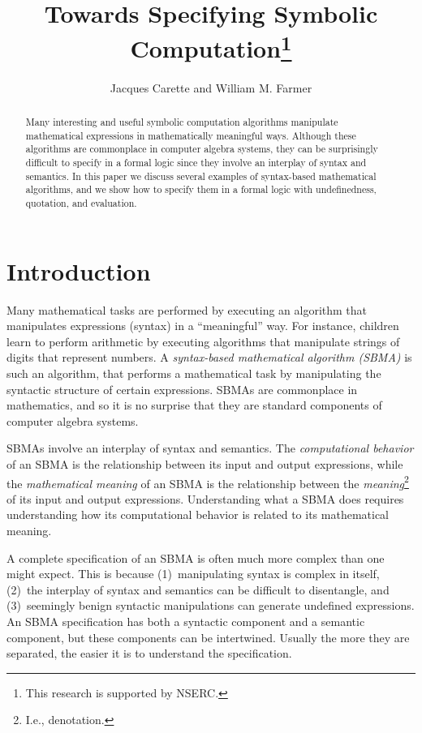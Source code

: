 \documentclass[fleqn]{llncs}
\title{Towards Specifying Symbolic Computation\thanks{This research is
    supported by NSERC.}}
\author{Jacques Carette and William M. Farmer}
\institute{%
Computing and Software, McMaster University, Canada\\
\url{http://www.cas.mcmaster.ca/~carette}\\
\url{http://imps.mcmaster.ca/wmfarmer}%
}
\begin{document}
\maketitle

\begin{abstract}
\bsp
Many interesting and useful symbolic computation algorithms manipulate
mathematical expressions in mathematically meaningful ways.  Although
these algorithms are commonplace in computer algebra systems, they can
be surprisingly difficult to specify in a formal logic since they
involve an interplay of syntax and semantics.  In this paper we
discuss several examples of syntax-based mathematical algorithms, and
we show how to specify them in a formal logic with undefinedness,
quotation, and evaluation.
\esp
\end{abstract}

\iffalse

\textbf{Keywords:} Symbolic computation, computer algebra systems,
reasoning about syntax, undefinedness, quotation and evaluation.

\fi

\section{Introduction}

Many mathematical tasks are performed by executing an algorithm that
manipulates expressions (syntax) in a ``meaningful'' way.  For instance,
children learn to perform arithmetic by executing algorithms that manipulate
strings of digits that represent numbers.  A \emph{syntax-based
mathematical algorithm (SBMA)} is such an algorithm, that performs a
mathematical task by manipulating the syntactic structure of certain
expressions.  SBMAs are commonplace in mathematics, and so it is no surprise
that they are standard components of computer algebra systems.

SBMAs involve an interplay of syntax and semantics.  The
\emph{computational behavior} of an SBMA is the relationship between
its input and output expressions, while the \emph{mathematical meaning} of an
SBMA is the relationship between the \emph{meaning}\footnote{I.e., denotation.} of its
input and output expressions.  Understanding what a SBMA does requires
understanding how its computational behavior is related to its mathematical
meaning.

A complete specification of an SBMA is often much more complex than
one might expect.  This is because (1)~manipulating syntax is complex
in itself, (2)~the interplay of syntax and semantics can be difficult
to disentangle, and (3)~seemingly benign syntactic
manipulations can generate undefined expressions.  An SBMA
specification has both a syntactic component and a semantic component,
but these components can be intertwined.  Usually the more they are
separated, the easier it is to understand the specification.
\end{document}
